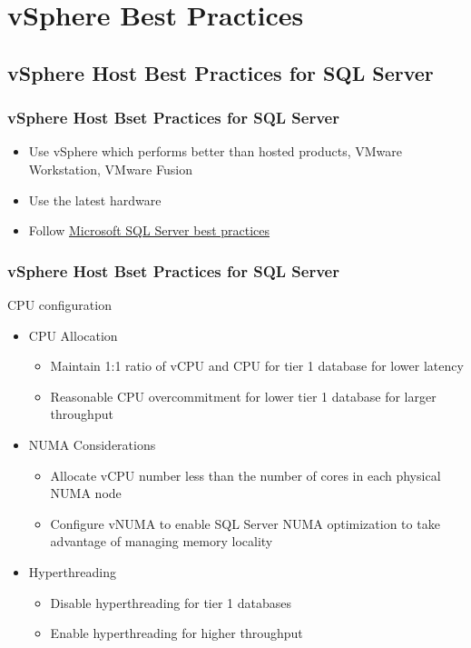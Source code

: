 \documentclass[CJK]{beamer}
\begin{document}
\section{vSphere Best Practices}
\subsection{vSphere Host Best Practices for SQL Server}
\begin{frame}[t]
    \frametitle{vSphere Host Bset Practices for SQL Server}
    \begin{itemize}
        \item Use vSphere which performs better than hosted products, VMware Workstation, VMware Fusion
        \item Use the latest hardware 
        \item Follow \href{http://technet.microsoft.com/en-us/sqlserver/bb671430.aspx}{Microsoft SQL Server best practices}
    \end{itemize}
\end{frame}

\begin{frame}[t]
    \frametitle{vSphere Host Bset Practices for SQL Server}
    CPU configuration
    \begin{itemize}
        \item CPU Allocation
        \begin{itemize}
            \item Maintain 1:1 ratio of vCPU and CPU for tier 1 database for lower latency
            \item Reasonable CPU overcommitment for lower tier 1 database for larger throughput
        \end{itemize}
        \item NUMA Considerations
        \begin{itemize}
            \item Allocate vCPU number less than the number of cores in each physical NUMA node
            \item Configure vNUMA to enable SQL Server NUMA optimization to take advantage of managing memory locality
        \end{itemize}
        \item Hyperthreading
        \begin{itemize}
            \item Disable hyperthreading for tier 1 databases
            \item Enable hyperthreading for higher throughput
        \end{itemize}
    \end{itemize}
\end{frame}
\end{document}
